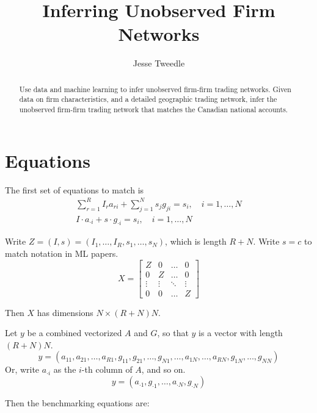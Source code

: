\documentclass[11pt]{article}
\begin{document}
\title{Inferring Unobserved Firm Networks}
\author{Jesse Tweedle}
\date{}


 \maketitle

\begin{abstract}

Use data and machine learning to infer unobserved firm-firm trading networks. Given data on firm characteristics, and a detailed geographic trading network, infer the unobserved firm-firm trading network that matches the Canadian national accounts.

\end{abstract}

\section{Equations}

The first set of equations to match is 
\begin{gather}
\sum_{r=1}^R I_r a_{ri} + \sum_{j=1}^N s_j g_{ji} = s_i , \quad i = 1,\ldots, N\\
I \cdot a_{\cdot i} + s \cdot g_{\cdot i} = s_i, \quad i = 1,\ldots, N
\end{gather}

Write $Z = (I,s) = (I_1,\ldots, I_R, s_1, \ldots, s_N)$, which is length $R+N$. Write $s=c$ to match notation in ML papers.
\[
X = 
\begin{bmatrix}
    Z & 0 & \dots  & 0 \\
    0 & Z &  \dots  & 0 \\
    \vdots & \vdots & \ddots & \vdots \\
    0 & 0  & \dots  & Z
\end{bmatrix}
\]

Then $X$ has dimensions $N \times (R+N)N$.

Let $y$ be a combined vectorized $A$ and $G$, so that $y$ is a vector with length $(R + N) N$. 
\[ 
y = (a_{11},a_{21},\ldots,a_{R1},g_{11},g_{21},\ldots,g_{N1},\ldots,a_{1N},\ldots,a_{RN},g_{1N},\ldots,g_{NN}) 
\]
Or, write $a_{\cdot i}$ as the $i$-th column of $A$, and so on.
\[ y = (a_{\cdot 1},g_{ \cdot 1},\ldots,a_{ \cdot N},g_{ \cdot N})\]

Then the benchmarking equations are:
\end{document}
